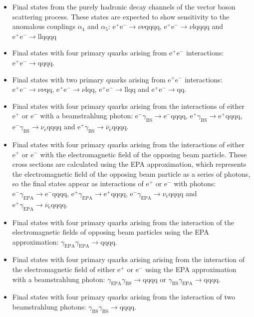 \begin{itemize}
\item Final states from the purely hadronic decay channels of the vector boson scattering process.  These states are expected to show sensitivity to the anomalous couplings $\alpha_{4}$ and $\alpha_{5}$: $\text{e}^{+}\text{e}^{-} \rightarrow \nu\nu\text{qqqq}$, $\text{e}^{+}\text{e}^{-} \rightarrow \nu\text{lqqqq}$ and $\text{e}^{+}\text{e}^{-} \rightarrow \text{llqqqq}$
\item Final states with four primary quarks arising from $\text{e}^{+}\text{e}^{-}$ interactions: $\text{e}^{+}\text{e}^{-} \rightarrow \text{qqqq}$.
\item Final states with two primary quarks arising from $\text{e}^{+}\text{e}^{-}$ interactions: $\text{e}^{+}\text{e}^{-} \rightarrow \nu{\nu}\text{qq}$, $\text{e}^{+}\text{e}^{-} \rightarrow \nu\text{lqq}$, $\text{e}^{+}\text{e}^{-} \rightarrow \text{llqq}$ and $\text{e}^{+}\text{e}^{-} \rightarrow \text{qq}$.
\item Final states with four primary quarks arising from the interactions of either $\text{e}^{+}$ or $\text{e}^{-}$ with a beamstrahlung photon: $\text{e}^{-}\gamma_{\text{BS}} \rightarrow \text{e}^{-}\text{qqqq}$, $\text{e}^{+}\gamma_{\text{BS}} \rightarrow \text{e}^{+}\text{qqqq}$, $\text{e}^{-}\gamma_{\text{BS}} \rightarrow \nu_{\text{e}}\text{qqqq}$ and $\text{e}^{+}\gamma_{\text{BS}} \rightarrow \overline{\nu}_{\text{e}}\text{qqqq}$.
\item Final states with four primary quarks arising from the interactions of either $\text{e}^{+}$ or $\text{e}^{-}$ with the electromagnetic field of the opposing beam particle.  These cross sections are calculated using the EPA approximation, which represents the electromagnetic field of the opposing beam particle as a series of photons, so the final states appear as interactions of $\text{e}^{+}$ or $\text{e}^{-}$ with photons: $\text{e}^{-}\gamma_{\text{EPA}} \rightarrow \text{e}^{-}\text{qqqq}$, $\text{e}^{+}\gamma_{\text{EPA}} \rightarrow \text{e}^{+}\text{qqqq}$, $\text{e}^{-}\gamma_{\text{EPA}} \rightarrow \nu_{\text{e}}\text{qqqq}$ and $\text{e}^{+}\gamma_{\text{EPA}} \rightarrow \overline{\nu}_{\text{e}}\text{qqqq}$.
\item Final states with four primary quarks arising from the interaction of the electromagnetic fields of opposing beam particles using the EPA approximation: $\gamma_{\text{EPA}}\gamma_{\text{EPA}} \rightarrow \text{qqqq}$.
\item Final states with four primary quarks arising arising from the interaction of the electromagnetic field of either $\text{e}^{+}$ or $\text{e}^{-}$ using the EPA approximation with a beamstrahlung photon: $\gamma_{\text{EPA}}\gamma_{\text{BS}} \rightarrow \text{qqqq}$ or $\gamma_{\text{BS}}\gamma_{\text{EPA}} \rightarrow \text{qqqq}$.
\item Final states with four primary quarks arising from the interaction of two beamstrahlung photons: $\gamma_{\text{BS}}\gamma_{\text{BS}} \rightarrow \text{qqqq}$.
\end{itemize}
